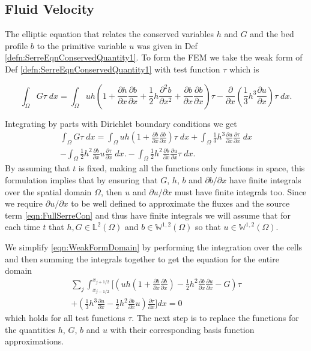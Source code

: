 \subsection{Fluid Velocity}
\label{subsec:FluidVelocity}
The elliptic equation that relates the conserved variables $h$ and $G$ and the bed profile $b$ to the primitive variable $u$ was given in Def \ref{defn:SerreEqnConservedQuantity1}. To form the FEM we take the weak form of Def \ref{defn:SerreEqnConservedQuantity1} with test function $\tau$ which is 

\begin{equation*}
	\int_{\Omega } G \tau \; dx =  \int_{\Omega } uh \left(1 + \frac{\partial h}{\partial x}\frac{\partial b}{\partial x} + \frac{1}{2}h\frac{\partial^2 b}{\partial x^2} + \frac{\partial b}{\partial x}\frac{\partial b}{\partial x} \right) \tau - \frac{\partial}{\partial x}\left(\frac{1}{3}h^3  \frac{\partial {u}}{\partial x}\right) \tau \; dx.
\end{equation*}

Integrating by parts with Dirichlet boundary conditions we get
\begin{multline}
\int_{\Omega } G \tau \; dx = \int_{\Omega } uh \left(1 + \frac{\partial b}{\partial x}\frac{\partial b}{\partial x} \right) \tau \; dx +  \int_{\Omega } \frac{1}{3}h^3  \frac{\partial {u}}{\partial x} \frac{\partial \tau}{\partial x} \; dx  \\ - 
\int_{\Omega }   \frac{1}{2}h^2\frac{\partial b}{\partial x} u \frac{\partial \tau }{\partial x}\; dx. - 
\int_{\Omega }   \frac{1}{2}h^2\frac{\partial b}{\partial x}  \frac{\partial u }{\partial x}\tau \; dx.
\label{eqn:WeakFormDomain}
\end{multline}
By assuming that $t$ is fixed, making all the functions only functions in space, this formulation implies that by ensuring that $G$, $h$, $b$ and $\partial b / \partial x$ have finite integrals over the spatial domain $\Omega$, then $u$ and $\partial u / \partial x$ must have finite integrals too. Since we require $\partial u / \partial x$ to be well defined to approximate the fluxes and the source term \eqref{eqn:FullSerreCon} and thus have finite integrals we will assume that for each time $t$ that $h,G \in \mathbb{L}^2(\Omega)$ and $b \in\mathbb{W}^{1,2}(\Omega)$ so that $u \in \mathbb{W}^{1,2}(\Omega)$. 

We simplify \eqref{eqn:WeakFormDomain} by performing the integration over the cells and then summing the integrals together to get the equation for the entire domain
\begin{multline}
\label{eq:elementwiseint}
 \sum_{j}  \int_{x_{j-1/2} }^{{x_{j+1/2}}} \Bigg[  \left( uh \left(1 + \frac{\partial b}{\partial x}\frac{\partial b}{\partial x} \right)  - \frac{1}{2}h^2\frac{\partial b}{\partial x}  \frac{\partial u }{\partial x}  -  G \right) \tau   \\ +  \left( \frac{1}{3}h^3  \frac{\partial {u}}{\partial x}    -     \frac{1}{2}h^2\frac{\partial b}{\partial x} u    \right) \frac{\partial \tau }{\partial x} \Bigg]dx  = 0
\end{multline}
which holds for all test functions $\tau$. The next step is to replace the functions for the quantities $h$, $G$, $b$ and $u$ with their corresponding basis function approximations. 

